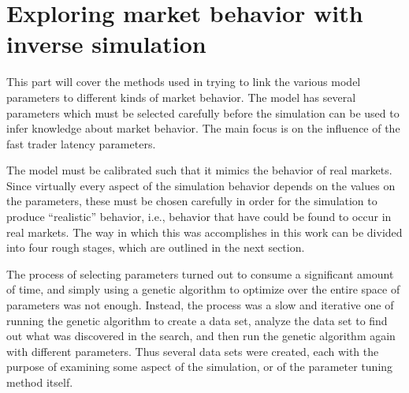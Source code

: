 
\part{Exploring market behavior with inverse simulation} %
This part will cover the methods used in trying to link the various model parameters to different kinds of market behavior. The model has several parameters which must be selected carefully before the simulation can be used to infer knowledge about market behavior. The main focus is on the influence of the fast trader latency parameters.

The model must be calibrated such that it mimics the behavior of real markets. Since virtually every aspect of the simulation behavior depends on the values on the parameters, these must be chosen carefully in order for the simulation to produce ``realistic'' behavior, i.e.,	behavior that have could be found to occur in real markets. The way in which this was accomplishes in this work can be divided into four rough stages, which are outlined in the next section. 

The process of selecting parameters turned out to consume a significant amount of time, and simply using a genetic algorithm to optimize over the entire space of parameters was not enough. Instead, the process was a slow and iterative one of running the genetic algorithm to create a data set, analyze the data set to find out what was discovered in the search, and then run the genetic algorithm again with different parameters. Thus several data sets were created, each with the purpose of examining some aspect of the simulation, or of the parameter tuning method itself. 











%






